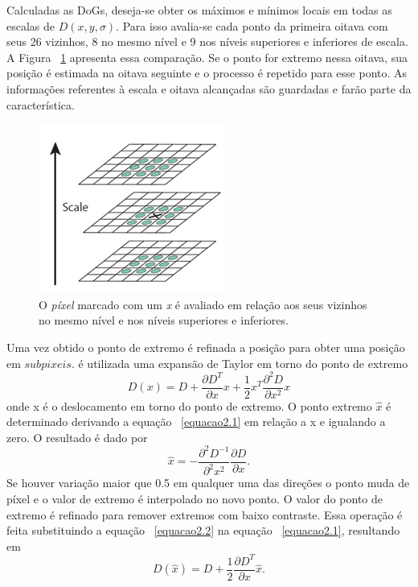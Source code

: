 Calculadas as DoGs, deseja-se obter os máximos e mínimos locais em todas as escalas de $\textit{D}(x,y,\sigma)$. Para isso avalia-se cada ponto da primeira oitava com seus 26 vizinhos, 8 no mesmo nível e 9 nos níveis superiores e inferiores de escala. A Figura ~\ref{fig:pixelcamadas} apresenta essa comparação. Se o ponto for extremo nessa oitava, sua posição é estimada na oitava seguinte e o processo é repetido para esse ponto. As informações referentes à escala e oitava alcançadas são guardadas e farão parte da característica. 


\begin{figure}[h!]
	\centering
	\includegraphics[width=0.5\linewidth]{figures/pixelCamadas}
	\caption{O \textit{píxel} marcado com um \textit{x} é avaliado em relação aos seus vizinhos no mesmo nível e nos níveis superiores e inferiores. \cite{VisualOdometryRodasVehicles}}
	\label{fig:pixelcamadas}
\end{figure}

Uma vez obtido o ponto de extremo é refinada a posição para obter uma posição em $\textit{subpixeis}$. é utilizada uma expansão de Taylor em torno do ponto de extremo \begin{equation}\label{equacao2.1}
D(x) = D + \frac{\partial D^T}{\partial x}x + \frac{1}{2}x^T\frac{\partial^2D}{\partial x^2}x
\end{equation} onde x é o deslocamento em torno do ponto de extremo. O ponto extremo $\hat{x}$ é determinado derivando a equação ~\ref{equacao2.1} em relação a x e igualando a zero. O resultado é dado por \begin{equation}\label{equacao2.2}
\hat{x} = -\frac{\partial^2D^{-1}}{\partial^2x^2}\frac{\partial D}{\partial x}. 
\end{equation} 
Se houver variação maior que 0.5 em qualquer uma das direções o ponto muda de píxel e o valor de extremo é interpolado no novo ponto. O valor do ponto de extremo é refinado para remover extremos com baixo contraste. Essa operação é feita substituindo a equação ~\ref{equacao2.2} na equação ~\ref{equacao2.1}, resultando em \[ D( \hat{x} ) = D + \frac{1}{2}\frac{\partial D^T}{\partial x} \hat{x} . \]

